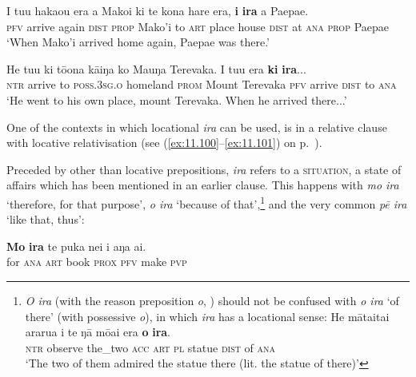 \ea\label{ex:4.233}
\gll I tu{\ꞌ}u haka{\ꞌ}ou era a Mako{\ꞌ}i ki te kona hare era, \textbf{{\ꞌ}i} \textbf{ira} a Paepae.  \\
\textsc{pfv} arrive again \textsc{dist} \textsc{prop} Mako’i to \textsc{art} place house \textsc{dist} at \textsc{ana} \textsc{prop} Paepae  \\

\glt 
‘When Mako’i arrived home again, Paepae was there.’ \textstyleExampleref{[R214.071]} 
\z

\ea\label{ex:4.234}
\gll He tu{\ꞌ}u ki tō{\ꞌ}ona kāiŋa ko Ma{\ꞌ}uŋa Terevaka. I tu{\ꞌ}u era \textbf{ki} \textbf{ira}...\\
\textsc{ntr} arrive to \textsc{poss.3sg.o} homeland \textsc{prom} Mount Terevaka \textsc{pfv} arrive \textsc{dist} to \textsc{ana}\\

\glt
‘He went to his own place, mount Terevaka. When he arrived there...’ \textstyleExampleref{[R314.159–160]}
\z

One of the contexts in which locational \textit{ira} can be used, is in a relative clause with locative relativisation (see (\ref{ex:11.100}–\ref{ex:11.101}) on p.~\pageref{ex:11.100}).

Preceded by other than locative prepositions, \textit{ira} refers to a \textsc{situation}, a state of affairs which has been mentioned in an earlier clause. This happens with \textit{mo ira} ‘therefore, for that purpose’, \textit{{\ꞌ}o ira} ‘because of that’,\footnote{\label{fn:227}\textit{{\ꞌ}O ira} (with the reason preposition \textit{{\ꞌ}o}, ) should not be confused with \textit{o ira} ‘of there’ (with possessive \textit{o}), in which \textit{ira} has a locational sense:
\ea
\gll 
He māta{\ꞌ}ita{\ꞌ}i ararua i te ŋā mōai era \textbf{o} \textbf{ira}.\\
  \textsc{ntr} observe the\_two \textsc{acc} \textsc{art} \textsc{pl} statue \textsc{dist} of \textsc{ana}\\
  \glt 
  ‘The two of them admired the statue there (lit. the statue of there)’ \textstyleExampleref{[R478.044]}\z  } and the very common \textit{pē ira} ‘like that, thus’:

\ea\label{ex:4.235}
\gll \textbf{Mo} \textbf{ira} te puka nei i aŋa ai. \\
for \textsc{ana} \textsc{art} book \textsc{prox} \textsc{pfv} make \textsc{pvp} \\

